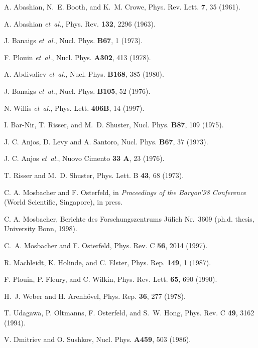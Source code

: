 \begin{thebibliography}{10}

A. Abashian, N.~E. Booth, and K.~M. Crowe, Phys. Rev. Lett. {\bf 7},  35
  (1961).

A. Abashian {\it et~al.}, Phys. Rev. {\bf 132},  2296  (1963).

J. Banaigs {\it et~al.}, Nucl. Phys. {\bf B67},  1  (1973).

F. Plouin {\it et~al.}, Nucl. Phys. {\bf A302},  413  (1978).

A. Abdivaliev {\it et~al.}, Nucl. Phys. {\bf B168},  385  (1980).

J. Banaigs {\it et~al.}, Nucl. Phys. {\bf B105},  52  (1976).

N. Willis {\it et~al.}, Phys. Lett. {\bf 406B},  14  (1997).

I. Bar-Nir, T. Risser, and M.~D. Shuster, Nucl. Phys. {\bf B87},  109  (1975).

J. C. Anjos, D. Levy and A. Santoro, Nucl. Phys. {\bf B67}, 37 (1973).

J. C. Anjos {\it et~al.}, Nuovo Cimento {\bf 33 A},  23  (1976).

T. Risser and M.~D. Shuster, Phys. Lett. B {\bf 43},  68  (1973).

C. A. Mosbacher and F. Osterfeld, in {\it Proceedings of the Baryon'98 Conference}
(World Scientific, Singapore), in press.

C. A. Mosbacher, Berichte des Forschungszentrums J\"ulich Nr.\ 3609 
(ph.d. thesis, University Bonn, 1998).

C.~A. Mosbacher and F. Osterfeld, Phys. Rev. C {\bf 56},  2014  (1997).

R. Machleidt, K. Holinde, and C. Elster, Phys. Rep. {\bf 149},  1  (1987).

F. Plouin, P. Fleury, and C. Wilkin, Phys. Rev. Lett. {\bf 65},  690  (1990).

H.~J. Weber and H. Arenh{\"o}vel, Phys. Rep. {\bf 36},  277  (1978).

T. Udagawa, P. Oltmanns, F. Osterfeld, and S.~W. Hong, Phys. Rev. C {\bf 49},
  3162  (1994).

V. Dmitriev and O. Sushkov, Nucl. Phys. {\bf A459},  503  (1986).


\end{thebibliography}
